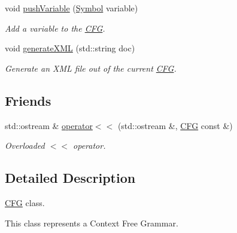 \begin{DoxyCompactItemize}
void \hyperlink{class_c_f_g_a8b938a7d91a94363ea2e5331566a4db5}{push\-Variable} (\hyperlink{class_symbol}{\-Symbol} variable)
\begin{DoxyCompactList}\small\item\em \-Add a variable to the \hyperlink{class_c_f_g}{\-C\-F\-G}. \end{DoxyCompactList}\item 
void \hyperlink{class_c_f_g_a9c88d8e8590d72d473cdbb8ec81e2ff5}{generate\-X\-M\-L} (std\-::string doc)
\begin{DoxyCompactList}\small\item\em \-Generate an \-X\-M\-L file out of the current \hyperlink{class_c_f_g}{\-C\-F\-G}. \end{DoxyCompactList}\end{DoxyCompactItemize}
\subsection*{\-Friends}
\begin{DoxyCompactItemize}
\item 
\hypertarget{class_c_f_g_a62fdc25beb43c0348577d873bb694a46}{std\-::ostream \& \hyperlink{class_c_f_g_a62fdc25beb43c0348577d873bb694a46}{operator$<$$<$} (std\-::ostream \&, \hyperlink{class_c_f_g}{\-C\-F\-G} const \&)}\label{class_c_f_g_a62fdc25beb43c0348577d873bb694a46}

\begin{DoxyCompactList}\small\item\em \-Overloaded $<$$<$ operator. \end{DoxyCompactList}\end{DoxyCompactItemize}


\subsection{\-Detailed \-Description}
\hyperlink{class_c_f_g}{\-C\-F\-G} class. 

\-This class represents a \-Context \-Free \-Grammar. 

